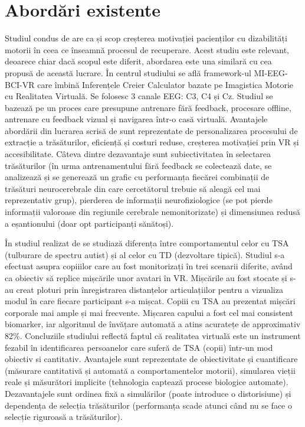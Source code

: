 \documentclass[12pt,a4paper]{report}
\theoremstyle{definition}
\theoremstyle{remark}
\begin{document}
\section{Abordări existente}

 Studiul condus de \textcite{Afdideh2025,} are ca și scop creșterea motivației pacienților cu dizabilități motorii în ceea ce înseamnă procesul de recuperare. Acest studiu este relevant, deoarece chiar dacă scopul este diferit, abordarea este una similară cu cea propusă de această lucrare. În centrul studiului se află framework-ul MI-EEG-BCI-VR care îmbină Inferențele Creier Calculator bazate pe Imagistica Motorie cu Realitatea Virtuală. Se folosesc 3 canale EEG: C3, C4 și Cz. Studiul se bazează pe un proces care presupune antrenare fără feedback, procesare offline, antrenare cu feedback vizual și navigarea într-o casă virtuală. Avantajele abordării din lucrarea scrisă de  \textcite{Afdideh2025,} sunt reprezentate de personalizarea procesului de extracție a trăsăturilor, eficiență și costuri reduse, creșterea motivației prin VR și accesibilitate. Câteva dintre dezavantaje sunt subiectivitatea în selectarea trăsăturilor (în urma antrenamentului fără feedback se colectează date, se analizează și se generează un grafic cu performanța fiecărei combinații de trăsături neurocerebrale din care cercetătorul trebuie să aleagă cel mai reprezentativ grup), pierderea de informații neurofiziologice (se pot pierde informații valoroase din regiunile cerebrale nemonitorizate) și dimensiunea redusă a eșantionului (doar opt participanți sănătoși). 

În studiul realizat de \textcite{AlcanizRaya2020} se studiază diferența între comportamentul celor cu TSA (tulburare de spectru autist) și al celor cu TD (dezvoltare tipică). Studiul s-a efectuat asupra copiiilor care au fost monitorizați în trei scenarii diferite, având ca obiectiv să replice mișcările unor avatari în VR. Mișcările au fost stocate și s-au creat ploturi prin înregistrarea distanțelor articulațiilor pentru a vizualiza modul în care fiecare participant s-a mișcat. Copiii cu TSA au prezentat mișcări corporale mai ample și mai frecvente. Mișcarea capului a fost cel mai consistent biomarker, iar algoritmul de învățare automată a atins acuratețe de approximativ 82\%. Concluziile studiului reflectă faptul că realitatea virtuală este un instrument fezabil în identificarea persoanelor care suferă de TSA (copii) într-un mod obiectiv si cantitativ. Avantajele sunt reprezentate de obiectivitate și cuantificare (măsurare cantitativă și automată a comportamentelor motorii), simularea vieții reale și măsurători implicite (tehnologia captează procese biologice automate). Dezavantajele sunt ordinea fixă a simulărilor (poate introduce o distorisiune) și dependența de selecția trăsăturilor (performanța scade atunci când nu se face o selecție riguroasă a trăsăturilor).
\end{document}

